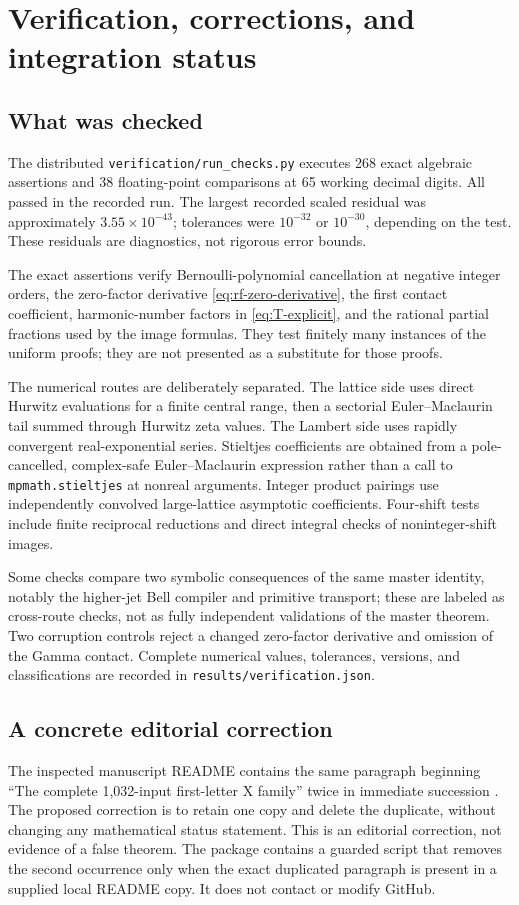 \documentclass[11pt,a4paper]{article}
\numberwithin{equation}{section}
\theoremstyle{definition}
\theoremstyle{remark}
\newcommand{\src}[1]{\nolinkurl{#1}}
\begin{document}
\section{Verification, corrections, and integration status}
\label{sec:audit}

\subsection{What was checked}
The distributed \src{verification/run_checks.py} executes 268 exact
algebraic assertions and 38 floating-point comparisons at 65 working
decimal digits. All passed in the recorded run. The largest recorded
scaled residual was approximately $3.55\times10^{-43}$; tolerances
were $10^{-32}$ or $10^{-30}$, depending on the test. These residuals
are diagnostics, not rigorous error bounds.

The exact assertions verify Bernoulli-polynomial cancellation at
negative integer orders, the zero-factor derivative
\eqref{eq:rf-zero-derivative}, the first contact coefficient,
harmonic-number factors in \eqref{eq:T-explicit}, and the rational
partial fractions used by the image formulas. They test finitely
many instances of the uniform proofs; they are not presented as a
substitute for those proofs.

The numerical routes are deliberately separated. The lattice side
uses direct Hurwitz evaluations for a finite central range, then a
sectorial Euler--Maclaurin tail summed through Hurwitz zeta values.
The Lambert side uses rapidly convergent real-exponential series.
Stieltjes coefficients are obtained from a pole-cancelled,
complex-safe Euler--Maclaurin expression rather than a call to
\src{mpmath.stieltjes} at nonreal arguments. Integer product
pairings use independently convolved large-lattice asymptotic
coefficients. Four-shift tests include finite reciprocal reductions
and direct integral checks of noninteger-shift images.

Some checks compare two symbolic consequences of the same master
identity, notably the higher-jet Bell compiler and primitive
transport; these are labeled as cross-route checks, not as fully
independent validations of the master theorem. Two corruption
controls reject a changed zero-factor derivative and omission of
the Gamma contact. Complete numerical values, tolerances, versions,
and classifications are recorded in \src{results/verification.json}.

\subsection{A concrete editorial correction}
The inspected manuscript README contains the same paragraph beginning
``The complete 1,032-input first-letter X family'' twice in immediate
succession \cite{RepoMain}. The proposed correction is to retain one
copy and delete the duplicate, without changing any mathematical
status statement. This is an editorial correction, not evidence of
a false theorem. The package contains a guarded script that removes
the second occurrence only when the exact duplicated paragraph is
present in a supplied local README copy. It does not contact or
modify GitHub.
\end{document}
